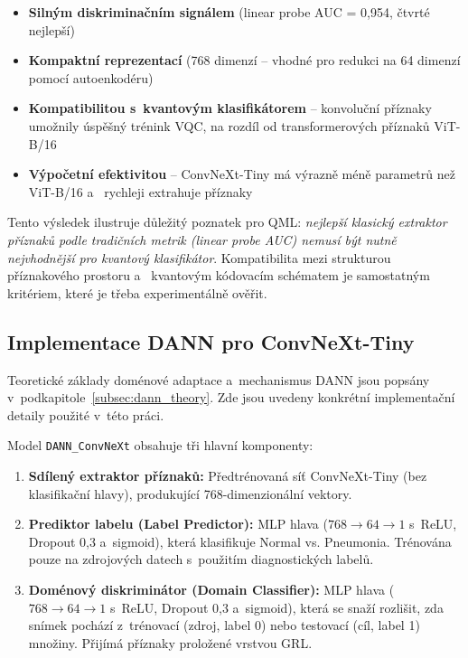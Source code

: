\documentclass[12pt, a4paper]{report}
\begin{document}
\begin{itemize}
    \item \textbf{Silným diskriminačním signálem} (linear probe AUC = 0,954, čtvrté nejlepší)
    \item \textbf{Kompaktní reprezentací} (768 dimenzí -- vhodné pro redukci na 64 dimenzí pomocí autoenkodéru)
    \item \textbf{Kompatibilitou s~kvantovým klasifikátorem} -- konvoluční příznaky umožnily úspěšný trénink VQC, na rozdíl od transformerových příznaků ViT-B/16
    \item \textbf{Výpočetní efektivitou} -- ConvNeXt-Tiny má výrazně méně parametrů než ViT-B/16 a ~rychleji extrahuje příznaky
\end{itemize}

Tento výsledek ilustruje důležitý poznatek pro QML: \emph{nejlepší klasický extraktor příznaků podle tradičních metrik (linear probe AUC) nemusí být nutně nejvhodnější pro kvantový klasifikátor}. Kompatibilita mezi strukturou příznakového prostoru a ~kvantovým kódovacím schématem je samostatným kritériem, které je třeba experimentálně ověřit.

\subsection{Implementace DANN pro ConvNeXt-Tiny} \label{subsec:dann}

Teoretické základy doménové adaptace a~mechanismus DANN jsou popsány v~podkapitole~\ref{subsec:dann_theory}. Zde jsou uvedeny konkrétní implementační detaily použité v~této práci.

Model \texttt{DANN\_ConvNeXt} obsahuje tři hlavní komponenty:
\begin{enumerate}
    \item \textbf{Sdílený extraktor příznaků:} Předtrénovaná síť ConvNeXt-Tiny (bez klasifikační hlavy), produkující 768-dimenzionální vektory.
    \item \textbf{Prediktor labelu (Label Predictor):} MLP hlava ($768 \to 64 \to 1$ s~ReLU, Dropout 0,3 a~sigmoid), která klasifikuje Normal vs. Pneumonia. Trénována pouze na zdrojových datech s~použitím diagnostických labelů.
    \item \textbf{Doménový diskriminátor (Domain Classifier):} MLP hlava ($768 \to 64 \to 1$ s~ReLU, Dropout 0,3 a~sigmoid), která se snaží rozlišit, zda snímek pochází z~trénovací (zdroj, label 0) nebo testovací (cíl, label 1) množiny. Přijímá příznaky proložené vrstvou GRL.
\end{enumerate}
\end{document}
